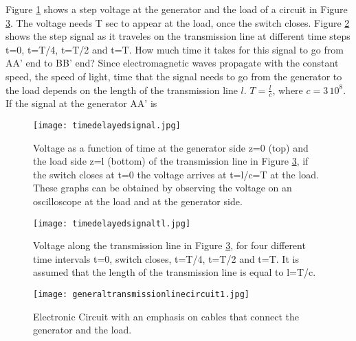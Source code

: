 \documentclass{ximera}
\begin{document}
Figure \ref{timedelaysig} shows a step voltage at the generator and the load of a circuit in Figure \ref{elcric}. The voltage needs T sec to appear at the load, once the switch closes. Figure \ref{delayedsig} shows the step signal as it traveles on the transmission line at different time steps t=0, t=T/4, t=T/2 and t=T.
How much time it takes for this signal to go from AA' end to BB' end? 
Since electromagnetic waves propagate with the constant speed, the speed of light, time that  the signal needs to go from the generator to  the load  depends  on the length of the transmission line $ l$.  $T=\frac{l}{c}$, where $c=3\, 10^8$. If the signal at the generator AA' is


\begin{figure}[htbp]
\begin{center}
\texttt{[image: timedelayedsignal.jpg]}  
\end{center}
\caption{Voltage as a function of time at the generator side z=0 (top) and the load side z=l (bottom) of the transmission line in Figure \ref{elcric}, if the switch closes at t=0 the voltage arrives at t=l/c=T at the load. These graphs can be obtained by observing the voltage on an oscilloscope at the load and at the generator side.}
\label{timedelaysig}  \end{figure}



\begin{figure}[htbp]
\begin{center}
\texttt{[image: timedelayedsignaltl.jpg]}
\end{center}
\caption{Voltage along the transmission line in Figure \ref{elcric}, for four different time intervals t=0, switch closes, t=T/4, t=T/2 and t=T. It is assumed that the length of the transmission line is equal to l=T/c.}
\label{delayedsig}
\end{figure}




\begin{figure}[htbp]
\begin{center}
\texttt{[image: generaltransmissionlinecircuit1.jpg]}
\end{center}
\caption{Electronic Circuit with an emphasis on cables that connect the generator and the load.}
\label{elcric}
\end{figure}
\end{document}
